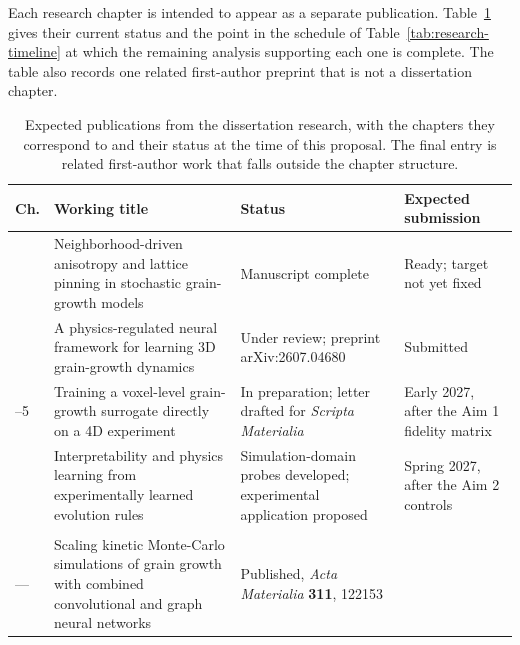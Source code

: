 \documentclass[proposalMode]{ufdissertation}
\begin{document}
Each research chapter is intended to appear as a separate publication. Table~\ref{tab:expected-publications} gives their current status and the point in the schedule of Table~\ref{tab:research-timeline} at which the remaining analysis supporting each one is complete. The table also records one related first-author preprint that is not a dissertation chapter.

\begin{table}[htbp]
\centering
\caption{Expected publications from the dissertation research, with the chapters they correspond to and their status at the time of this proposal. The final entry is related first-author work that falls outside the chapter structure.}
\label{tab:expected-publications}
\small

\begin{tabularx}{\textwidth}{@{}>{\raggedright\arraybackslash}p{}X>{\raggedright\arraybackslash}p{}>{\raggedright\arraybackslash}p{}@{}}

\toprule

\textbf{Ch.} & \textbf{Working title} & \textbf{Status} & \textbf{Expected submission} \\

\midrule

2 & Neighborhood-driven anisotropy and lattice pinning in stochastic grain-growth models & Manuscript complete & Ready; target not yet fixed \\

3 & A physics-regulated neural framework for learning 3D grain-growth dynamics & Under review; preprint arXiv:2607.04680 & Submitted \\

4--5 & Training a voxel-level grain-growth surrogate directly on a 4D experiment & In preparation; letter drafted for \emph{Scripta Materialia} & Early 2027, after the Aim 1 fidelity matrix \\

6 & Interpretability and physics learning from experimentally learned evolution rules & Simulation-domain probes developed; experimental application proposed & Spring 2027, after the Aim 2 controls \\

\addlinespace[3pt]
\multicolumn{4}{@{}l}{\emph{Related first-author work, outside the chapter structure}}\\
\addlinespace[2pt]

--- & Scaling kinetic Monte-Carlo simulations of grain growth with combined convolutional and graph neural networks & Published, \emph{Acta Materialia} \textbf{311}, 122153 & 2026 \\

\bottomrule

\end{tabularx}
\end{table}
\end{document}
